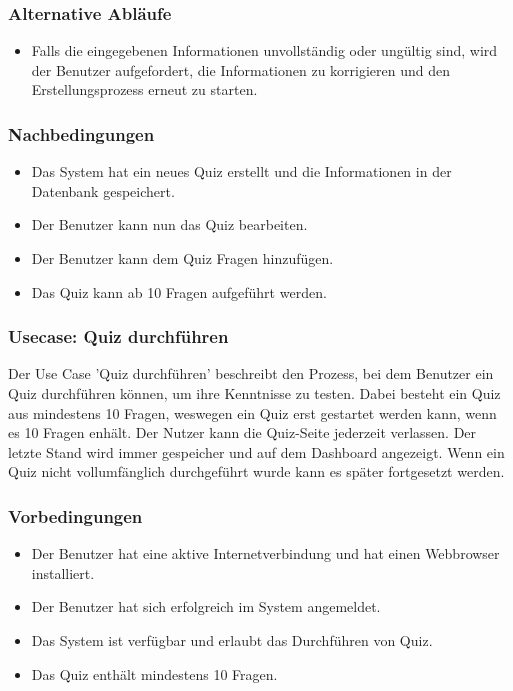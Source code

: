 \subsubsection*{Alternative Abläufe}

\begin{itemize}
  \item Falls die eingegebenen Informationen unvollständig oder ungültig sind, wird der Benutzer aufgefordert, die Informationen zu korrigieren
   und den Erstellungsprozess erneut zu starten.
\end{itemize}

\subsubsection*{Nachbedingungen}

\begin{itemize}
  \item Das System hat ein neues Quiz erstellt und die Informationen in der Datenbank gespeichert.
  \item Der Benutzer kann nun das Quiz bearbeiten.
  \item Der Benutzer kann dem Quiz Fragen hinzufügen.
  \item Das Quiz kann ab 10 Fragen aufgeführt werden.
\end{itemize}

\subsubsection{Usecase: Quiz durchführen}

Der Use Case 'Quiz durchführen' beschreibt den Prozess, bei dem Benutzer ein Quiz durchführen können, um ihre Kenntnisse zu testen.
Dabei besteht ein Quiz aus mindestens 10 Fragen, weswegen ein Quiz erst gestartet werden kann, wenn es 10 Fragen enhält.
Der Nutzer kann die Quiz-Seite jederzeit verlassen. Der letzte Stand wird immer gespeicher und auf dem Dashboard angezeigt.
Wenn ein Quiz nicht vollumfänglich durchgeführt wurde kann es später fortgesetzt werden.

\subsubsection*{Vorbedingungen}

\begin{itemize}
  \item Der Benutzer hat eine aktive Internetverbindung und hat einen Webbrowser installiert.
  \item Der Benutzer hat sich erfolgreich im System angemeldet.
  \item Das System ist verfügbar und erlaubt das Durchführen von Quiz.
  \item Das Quiz enthält mindestens 10 Fragen.
\end{itemize}

